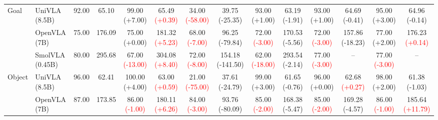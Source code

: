 \begin{table}[t]
{\begin{tabular}{llcccccccccccc}
\cmidrule(lr){1-14}
\multirow{3}{*}{Goal} & UniVLA (8.5B) & 92.00 & 65.10 & 99.00 {\scriptsize\textcolor{green!50!black}{(+7.00)}} & 65.49 {\scriptsize\textcolor{red}{(+0.39)}} & 34.00 {\scriptsize\textcolor{red}{(-58.00)}} & 39.75 {\scriptsize\textcolor{green!50!black}{(-25.35)}} & 93.00 {\scriptsize\textcolor{green!50!black}{(+1.00)}} & 63.19 {\scriptsize\textcolor{green!50!black}{(-1.91)}} & 93.00 {\scriptsize\textcolor{green!50!black}{(+1.00)}} & 64.69 {\scriptsize\textcolor{green!50!black}{(-0.41)}} & 95.00 {\scriptsize\textcolor{green!50!black}{(+3.00)}} & 64.96 {\scriptsize\textcolor{green!50!black}{(-0.14)}} \\
 & OpenVLA (7B) & 75.00 & 176.09 & 75.00 {\scriptsize\textcolor{green!50!black}{(+0.00)}} & 181.32 {\scriptsize\textcolor{red}{(+5.23)}} & 68.00 {\scriptsize\textcolor{red}{(-7.00)}} & 96.25 {\scriptsize\textcolor{green!50!black}{(-79.84)}} & 72.00 {\scriptsize\textcolor{red}{(-3.00)}} & 170.53 {\scriptsize\textcolor{green!50!black}{(-5.56)}} & 72.00 {\scriptsize\textcolor{red}{(-3.00)}} & 157.86 {\scriptsize\textcolor{green!50!black}{(-18.23)}} & 77.00 {\scriptsize\textcolor{green!50!black}{(+2.00)}} & 176.23 {\scriptsize\textcolor{red}{(+0.14)}} \\
 & SmolVLA (0.45B) & 80.00 & 295.68 & 67.00 {\scriptsize\textcolor{red}{(-13.00)}} & 304.08 {\scriptsize\textcolor{red}{(+8.40)}} & 72.00 {\scriptsize\textcolor{red}{(-8.00)}} & 154.18 {\scriptsize\textcolor{green!50!black}{(-141.50)}} & 62.00 {\scriptsize\textcolor{red}{(-18.00)}} & 293.54 {\scriptsize\textcolor{green!50!black}{(-2.14)}} & 77.00 {\scriptsize\textcolor{red}{(-3.00)}} & -- & 77.00 {\scriptsize\textcolor{red}{(-3.00)}} & -- \\
\cmidrule(lr){1-14}
\multirow{3}{*}{Object} & UniVLA (8.5B) & 96.00 & 62.41 & 100.00 {\scriptsize\textcolor{green!50!black}{(+4.00)}} & 63.00 {\scriptsize\textcolor{red}{(+0.59)}} & 21.00 {\scriptsize\textcolor{red}{(-75.00)}} & 37.61 {\scriptsize\textcolor{green!50!black}{(-24.79)}} & 99.00 {\scriptsize\textcolor{green!50!black}{(+3.00)}} & 61.65 {\scriptsize\textcolor{green!50!black}{(-0.76)}} & 96.00 {\scriptsize\textcolor{green!50!black}{(+0.00)}} & 62.68 {\scriptsize\textcolor{red}{(+0.27)}} & 98.00 {\scriptsize\textcolor{green!50!black}{(+2.00)}} & 61.38 {\scriptsize\textcolor{green!50!black}{(-1.03)}} \\
 & OpenVLA (7B) & 87.00 & 173.85 & 86.00 {\scriptsize\textcolor{red}{(-1.00)}} & 180.11 {\scriptsize\textcolor{red}{(+6.26)}} & 84.00 {\scriptsize\textcolor{red}{(-3.00)}} & 93.76 {\scriptsize\textcolor{green!50!black}{(-80.09)}} & 85.00 {\scriptsize\textcolor{red}{(-2.00)}} & 168.38 {\scriptsize\textcolor{green!50!black}{(-5.47)}} & 85.00 {\scriptsize\textcolor{red}{(-2.00)}} & 169.28 {\scriptsize\textcolor{green!50!black}{(-4.57)}} & 86.00 {\scriptsize\textcolor{red}{(-1.00)}} & 185.64 {\scriptsize\textcolor{red}{(+11.79)}} \\

\end{tabular}}
\end{table}

